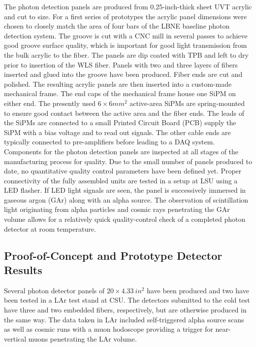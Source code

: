 The photon detection panels are produced from 0.25-inch-thick
sheet UVT acrylic and cut to size. For a first series of prototypes
the acrylic panel dimensions were chosen to closely match the area of
four bars of the LBNE baseline  photon detection system.  The groove is
cut with a CNC mill in several passes to achieve good groove surface
quality, which is important for good light transmission from the bulk
acrylic to the fiber. The panels are dip coated with TPB and left to
dry prior to insertion of the WLS fiber. Panels with two and three
layers of fibers inserted and glued into the groove have been
produced. Fiber ends are cut and polished.  The resulting acrylic
panels are then inserted into a custom-made mechanical frame.%
The end caps of the mechanical frame
house one SiPM on either end. The presently used $6\times6 mm^2$ active-area
SiPMs are spring-mounted to ensure good contact between the active area
and the fiber ends.  The leads of the SiPMs are connected to a small
Printed Circuit Board (PCB)  %
supply the SiPM with a bias voltage and to read out signals. The other
cable ends are typically connected to pre-amplifiers before leading to
a DAQ system.  Components for the photon detection panels are
inspected at all stages of the manufacturing process for quality. Due
to the small number of panels produced to date, no quantitative quality
control parameters have been defined yet.  Proper connectivity of the
fully assembled units are tested in a setup at LSU using a LED
flasher. If LED light signals are seen, the panel is successively
immersed in gaseous argon (GAr) along with an alpha source. The
observation of %
scintillation light originating from alpha
particles and cosmic rays penetrating the GAr volume allows for a
relatively quick quality-control check of a completed photon detector
at room temperature.

\subsection{Proof-of-Concept and Prototype Detector Results}

Several photon detector panels of $20 \times 4.33~in^2$ have been
produced and two have been tested in a LAr test stand at CSU. The
detectors submitted to the cold test have three and two embedded fibers,
respectively, but are otherwise produced in the same way. The data
taken in LAr included self-triggered alpha source scans as well as
cosmic runs with a muon hodoscope providing a trigger for near-vertical muons penetrating the LAr volume.
